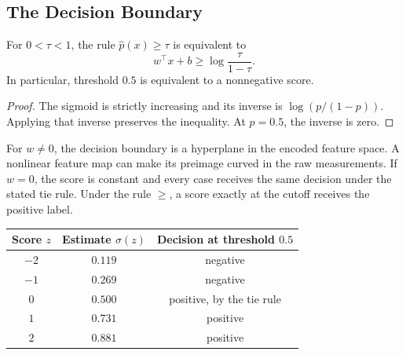 \subsection{The Decision Boundary}

\par\medskip\noindent\begin{minipage}{\linewidth}
\begin{theorem}
For $0<\tau<1$, the rule $\hat p(x)\geq\tau$ is equivalent to
\[
w^\top x+b\geq\log\frac{\tau}{1-\tau}.
\]
In particular, threshold $0.5$ is equivalent to a nonnegative score.
\end{theorem}
\begin{proof}
The sigmoid is strictly increasing and its inverse is $\log(p/(1-p))$. Applying that inverse preserves the inequality. At $p=0.5$, the inverse is zero.
\end{proof}
\end{minipage}\par\medskip

For $w\ne0$, the decision boundary is a hyperplane in the encoded feature space. A nonlinear feature map can make its preimage curved in the raw measurements. If $w=0$, the score is constant and every case receives the same decision under the stated tie rule. Under the rule $\geq$, a score exactly at the cutoff receives the positive label.

\par\addvspace{\intextsep}\noindent\begin{minipage}{\linewidth}
\centering\small
\begin{tabular}{@{}ccc@{}}
\toprule
Score $z$ & Estimate $\sigma(z)$ & Decision at threshold $0.5$ \\
\midrule
$-2$ & $0.119$ & negative \\
$-1$ & $0.269$ & negative \\
$0$ & $0.500$ & positive, by the tie rule \\
$1$ & $0.731$ & positive \\
$2$ & $0.881$ & positive \\
\bottomrule
\end{tabular}
\label{tab:logit-lookup}
\end{minipage}\par\addvspace{\intextsep}

